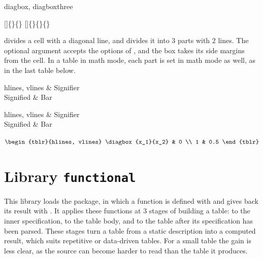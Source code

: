 \begin{codedescribe}[
        code,
        new=2021L
    ]{diagbox, diagboxthree}
    \begin{codesyntax}
        []\{\}\{\}
        []\{\}\{\}\{\}
    \end{codesyntax}
     divides a cell with a diagonal line, and  divides it into 3 parts with 2 lines. The optional argument accepts the options of , and the box takes its side margins from the cell. In a table in math mode, each part is set in math mode as well, as in the last table below.

    \begin{codestore}[st=lib:diagbox]
        \begin{tblr}{hlines, vlines}
             & Signifier \\
            Signified      & Bar
        \end{tblr}\quad
        \begin{tblr}{hlines, vlines}
             & Signifier \\
            Signified                & Bar
        \end{tblr}\quad
        $\begin{tblr}{hlines, vlines}
                \diagbox{x_1}{x_2} & 0   \\
                1                  & 0.5
            \end{tblr}$\end{codestore}
    \begin{center}
    \end{center}
\end{codedescribe}

\section{Library \texttt{functional}}\label{lib:functional}
This library loads the  package, in which a function is defined with \tsobj[code]{\prgNewFunction} and gives back its result with \tsobj[code]{\prgReturn}. It applies these functions at 3 stages of building a table: to the inner specification, to the table body, and to the table after its specification has been parsed. These stages turn a table from a static description into a computed result, which suits repetitive or data-driven tables. For a small table the gain is less clear, as the source can become harder to read than the table it produces.

